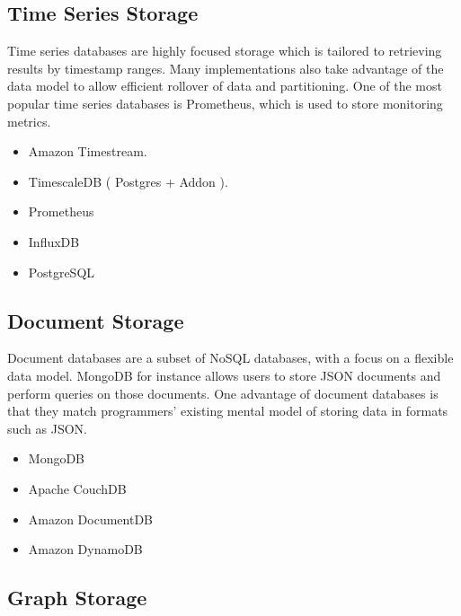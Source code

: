\documentclass{csse4400}
\begin{document}
\subsection{Time Series Storage}


Time series databases are highly focused storage which is tailored to retrieving results by timestamp ranges.
Many implementations also take advantage of the data model to allow efficient rollover of data and partitioning.
One of the most popular time series databases is Prometheus, which is used to store monitoring metrics.

\begin{itemize}
  \item Amazon Timestream.
  \item TimescaleDB ( Postgres + Addon ).
  \item Prometheus
  \item InfluxDB
  \item PostgreSQL
\end{itemize}

\subsection{Document Storage}

Document databases are a subset of NoSQL databases, with a focus on a flexible data model.
MongoDB for instance allows users to store JSON documents and perform queries on those documents.
One advantage of document databases is that they match programmers' existing mental model of storing data in formats such as JSON.

\begin{itemize}
  \item MongoDB
  \item Apache CouchDB
  \item Amazon DocumentDB
  \item Amazon DynamoDB
\end{itemize}

\subsection{Graph Storage}

\end{document}
